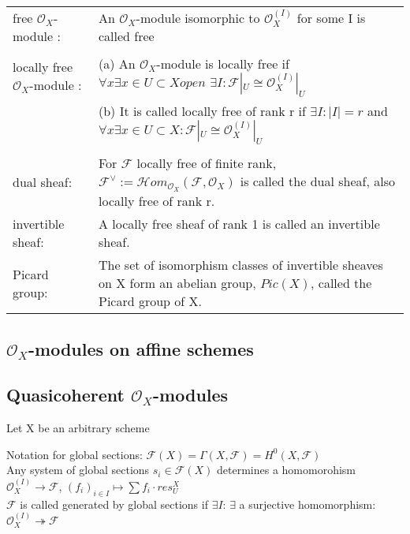 \documentclass[a4paper, 12pt]{article}
\newcommand{\ca}[1]{\mathcal{#1}}
\newcommand{\caf}{\mathcal{F}}
\newcommand{\oxmod}{$\mathcal{O}_X$-module }
\newcommand{\oxmods}{$\mathcal{O}_X$-modules }
\newcommand{\ox}{\mathcal{O}_X}
\begin{document}
\begin{tabular}{p{4cm} p{12cm}}

free \oxmod: & An \oxmod   isomorphic to $\ox^{(I)}$ for some I is called free\\

&\\

locally free \oxmod: 

   &(a)  An \oxmod is locally free if $\forall x  \exists  x\in U \subset X open $ $\exists I : \caf|_U \cong \ox^{(I)}|_U$\\
   &(b)  It is called locally free of rank r if $\exists I : |I| = r $   and $ \forall x \exists x \in U \subset X : \caf|_U \cong \ox^{(I)}|_U$\\
\\

dual sheaf: & For $\caf$ locally free of finite rank, $\caf^{\vee} := \ca{H}om_{\ox}(\caf, \ox)$ is called the dual sheaf, also locally free of rank r.\\


invertible sheaf: & A locally free sheaf of rank 1 is called an invertible sheaf.\\


Picard group: & The set of isomorphism classes of invertible sheaves on X form an abelian group, $Pic(X)$, called the Picard group of X.\\


\end{tabular}

\subsection{\oxmods on affine schemes}

\subsection{Quasicoherent \oxmods }

Let X be an arbitrary scheme

Notation for global sections:
$\caf(X) = \Gamma(X, \caf) = H^0(X,\caf)$
\\

Any system of global sections $s_i \in \caf(X)$ determines a homomorohism $\ox^{(I)}\longrightarrow\caf$, $(f_i)_{i\in I }\longmapsto \sum f_i \cdot  res^{X}_{U}$\\

$\caf$ is called generated by global sections if $\exists I $: $\exists$ a surjective homomorphism:  $\ox^{(I)}\twoheadrightarrow \caf$ 
\\
\end{document}
